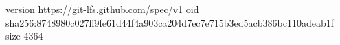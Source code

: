 version https://git-lfs.github.com/spec/v1
oid sha256:8748980c027ff9fe61d44f4a903ca204d7ec7e715b3ed5acb386bc110adeab1f
size 4364
